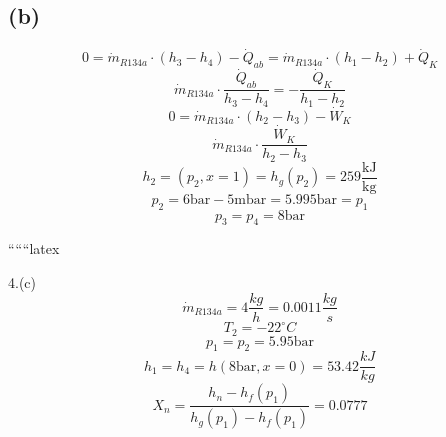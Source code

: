 

\subsection*{(b)}
\[
0 = \dot{m}_{R134a} \cdot (h_3 - h_4) - \dot{Q}_{ab} = \dot{m}_{R134a} \cdot (h_1 - h_2) + \dot{Q}_K
\]
\[
\dot{m}_{R134a} \cdot \frac{\dot{Q}_{ab}}{h_3 - h_4} = - \frac{\dot{Q}_K}{h_1 - h_2}
\]
\[
0 = \dot{m}_{R134a} \cdot (h_2 - h_3) - \dot{W}_K
\]
\[
\dot{m}_{R134a} \cdot \frac{\dot{W}_K}{h_2 - h_3}
\]
\[
h_2 = (p_2, x=1) = h_g(p_2) = 259 \frac{\text{kJ}}{\text{kg}}
\]
\[
p_2 = 6 \text{bar} - 5 \text{mbar} = 5.995 \text{bar} = p_1
\]
\[
p_3 = p_4 = 8 \text{bar}
\]

``````latex


4.(c) 
\[
\dot{m}_{R134a} = 4 \frac{kg}{h} = 0.0011 \frac{kg}{s}
\]
\[
T_2 = -22^\circ C
\]
\[
p_1 = p_2 = 5.95 \text{bar}
\]
\[
h_1 = h_4 = h(8 \text{bar}, x=0) = 53.42 \frac{kJ}{kg}
\]
\[
X_n = \frac{h_n - h_f(p_1)}{h_g(p_1) - h_f(p_1)} = 0.0777
\]